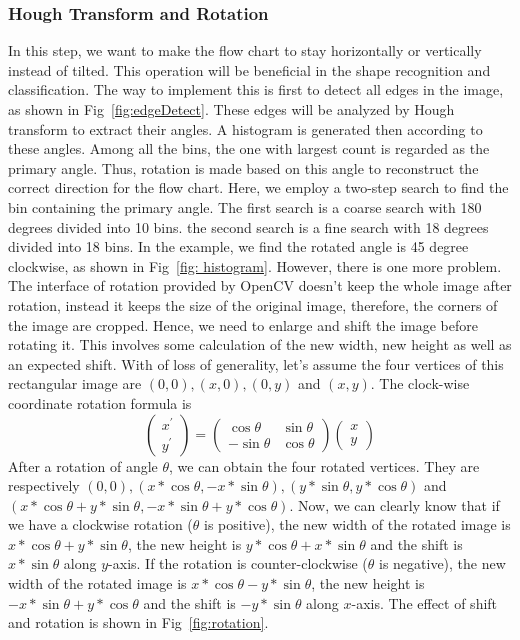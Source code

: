 \documentclass[conference,twocolumn]{IEEEtran}
\begin{document}
\subsubsection{Hough Transform and Rotation}
In this step, we want to make the flow chart to stay horizontally or vertically instead of tilted. This operation will be beneficial in the shape recognition and classification. The way to implement this is first to detect all edges in the image, as shown in Fig~\ref{fig:edgeDetect}. These edges will be analyzed by Hough transform to extract their angles. A histogram is generated then according to these angles. Among all the bins, the one with largest count is regarded as the primary angle. Thus, rotation is made based on this angle to reconstruct the correct direction for the flow chart. Here, we employ a two-step search to find the bin containing the primary angle. The first search is a coarse search with 180 degrees divided into 10 bins. the second search is a fine search with 18 degrees divided into 18 bins. In the example, we find the rotated angle is 45 degree clockwise, as shown in Fig~\ref{fig: histogram}. However, there is one more problem. The interface of rotation provided by OpenCV doesn't keep the whole image after rotation, instead it keeps the size of the original image, therefore, the corners of the image are cropped. Hence, we need to enlarge and shift the image before rotating it. This involves some calculation of the new width, new height as well as an expected shift. With of loss of generality, let's assume the four vertices of this rectangular image are $(0, 0), (x, 0), (0, y)$ and $(x, y)$. The clock-wise coordinate rotation formula is
$$
\left( \begin{array}{cc}
x^\prime \\
y^\prime
\end{array} \right)
=
\left( \begin{array}{cc}
\cos\theta & \sin\theta \\
-\sin\theta & \cos\theta
\end{array} \right)
%
\left( \begin{array}{cc}
x \\
y
\end{array} \right)
$$
After a rotation of angle $\theta$, we can obtain the four rotated vertices. They are respectively $(0, 0), (x*\cos\theta, -x*\sin\theta), (y*\sin\theta, y*\cos\theta)$ and $ (x*\cos\theta+y*\sin\theta, -x*\sin\theta+y*\cos\theta)$.
Now, we can clearly know that if we have a clockwise rotation ($\theta$ is positive), the new width of the rotated image is $x * \cos\theta + y * \sin\theta$, the new height is $y * \cos\theta + x * \sin\theta$ and the shift is $x * \sin\theta$ along $y$-axis. If the rotation is counter-clockwise ($\theta$ is negative), the new width of the rotated image is $x * \cos\theta - y * \sin\theta$, the new height is $-x * \sin\theta + y * \cos\theta$ and the shift is $-y * \sin\theta$ along $x$-axis.
The effect of shift and rotation is shown in Fig~\ref{fig:rotation}.
\end{document}
